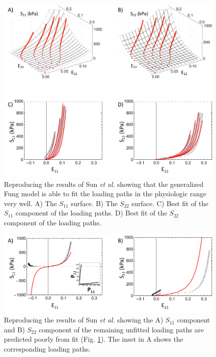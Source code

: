 \begin{figure}[hptb]
\centering
\includegraphics[width=6.5in]{Figures/fungphyfit}
\caption{Reproducing the results of Sun \textit{et al.} \cite{sun_biaxial_2003} showing that the generalized Fung model is able to fit the loading paths in the physiologic range very well. A) The $S_{11}$ surface. B) The $S_{22}$ surface. C) Best fit of the $S_{11}$ component of the loading paths. D) Best fit of the $S_{22}$ component of the loading paths.}
\label{fig:fungphyfit}
\end{figure} 

\begin{figure}[hptb]
\centering
\includegraphics[width=6.5in]{Figures/fungphypred}
\caption{Reproducing the results of Sun \textit{et al.} \cite{sun_biaxial_2003} showing the A) $S_{11}$ component and B) $S_{22}$ component of the remaining unfitted loading paths are predicted poorly from fit (Fig. \ref{fig:fungphyfit}). The inset in A shows the corresponding loading paths.}
\label{fig:fungphypred}
\end{figure} 


